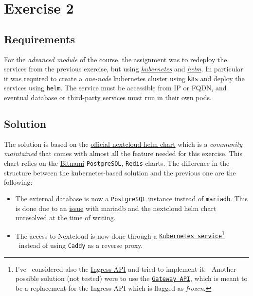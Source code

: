 \section{Exercise 2}

\subsection{Requirements}
\label{subsec:requirements}

For the \textit{advanced module} of the course, the assignment was to redeploy the services from the previous exercise, but using \href{https://kubernetes.io/}{\textit{kubernetes}} and \href{https://helm.sh/}{\textit{helm}}.
In particular it was required to create a \textit{one-node} kubernetes cluster using \texttt{k8s} and deploy the services using \texttt{helm}. 
The service must be accessible from IP or FQDN, and eventual database or third-party services must run in their own pods.

\subsection{Solution}

The solution is based on the \href{https://github.com/nextcloud/helm/tree/main/charts/nextcloud}{official nextcloud helm chart} which is a \textit{community maintained} that comes with almost all the feature needed for this exercise. 
This chart relies on the \href{https://bitnami.com/}{Bitnami} \texttt{PostgreSQL}, \texttt{Redis} charts.
The difference in the structure between the kubernetes-based solution and the previous one are the following: 

\begin{itemize}
    \itemsep0em
    \item The external database is now a \texttt{PostgreSQL} instance instead of \texttt{mariadb}. This is done due to an \href{https://github.com/nextcloud/helm/issues/506}{issue} with mariadb and the nextcloud helm chart unresolved at the time of writing.
    \item The access to Nextcloud is now done through a \href{https://kubernetes.io/docs/tutorials/kubernetes-basics/expose/expose-intro/}{\texttt{Kubernetes service}}\footnote{I've \
        considered also the \href{https://kubernetes.io/docs/concepts/services-networking/ingress/}{Ingress API} and tried to implement it. \
        Another possible solution (not tested) were to use the \href{https://kubernetes.io/docs/concepts/services-networking/gateway/}{\texttt{Gateway API}}, which is meant to be a replacement for the Ingress API which is flagged as \textit{frozen}.} \ 
        instead of using \texttt{Caddy} as a reverse proxy.
\end{itemize}

